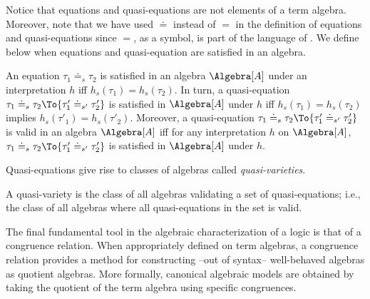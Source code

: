 Notice that equations and quasi-equations are not elements of a term algebra.
Moreover, note that we have used $\doteq$ instead of $=$ in the definition of equations and quasi-equations since $=$, as a symbol, is part of the language of \DAL.
We define below when equations and quasi-equation are satisfied in an algebra.

\medskip
\begin{definition}
	An equation $\tau_1 \doteq_s \tau_2$ is satisfied in an algebra $\Algebra[A]$ under an interpretation $h$ iff ${h_s(\tau_1) = h_s(\tau_2)}$.
	In turn,
		a quasi-equation
			${{\tau_1 \doteq_s	\tau_2} \To {\tau'_1 \doteq_{s'} \tau'_2}}$
		is satisfied in
			$\Algebra[A]$ under $h$
		iff
			${h_s(\tau_1) = h_s(\tau_2)}$ implies ${h_s(\tau'_1) = h_s(\tau'_2)}$.
	Moreover,
		a quasi-equation
			${{\tau_1 \doteq_s	\tau_2} \To {\tau'_1 \doteq_{s'} \tau'_2}}$
		is valid in an algebra
			$\Algebra[A]$
		iff
			for any interpretation $h$ on $\Algebra[A]$,
				${{\tau_1 \doteq_s	\tau_2} \To {\tau'_1 \doteq_{s'} \tau'_2}}$ is satisfied in $\Algebra[A]$ under $h$.
\end{definition}

\medskip

Quasi-equations give rise to classes of algebras called \emph{quasi-varieties}.

\medskip
\begin{definition}
	A quasi-variety is the class of all algebras validating a set of quasi-equations; i.e., the class of all algebras where all quasi-equations in the set is valid.
\end{definition}
\medskip

The final fundamental tool in the algebraic characterization of a logic is that of a congruence relation. When appropriately defined on term algebras, a congruence relation provides a method for constructing --out of syntax-- well-behaved algebras as quotient algebras. More formally, canonical algebraic models are obtained by taking the quotient of the term algebra using specific congruences.

